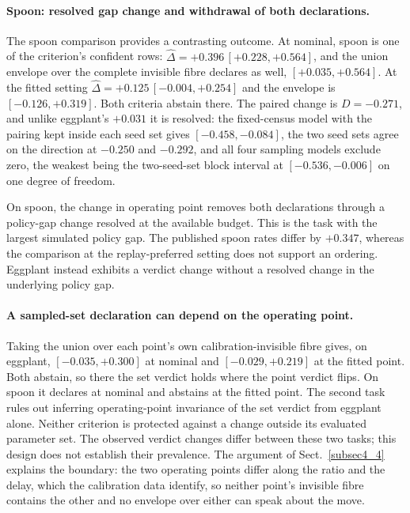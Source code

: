 \documentclass[pdflatex,iicol,sn-apa]{sn-jnl}
\theoremstyle{remark}
\begin{document}
\paragraph{Spoon: resolved gap change and withdrawal of both declarations.}
The spoon comparison provides a contrasting outcome. At nominal, spoon is one of the criterion's confident rows:
$\hat\Delta = +0.396\,[+0.228, +0.564]$, and the union envelope over the complete invisible fibre
declares as well, $[+0.035, +0.564]$. At the fitted setting $\hat\Delta = +0.125\,[-0.004, +0.254]$
and the envelope is $[-0.126, +0.319]$. Both criteria abstain there. The paired change is
$D = -0.271$, and unlike eggplant's $+0.031$ it is resolved: the fixed-census model with the
pairing kept inside each seed set gives $[-0.458, -0.084]$, the two seed sets agree on the direction
at $-0.250$ and $-0.292$, and all four sampling models exclude zero, the weakest being the
two-seed-set block interval at $[-0.536, -0.006]$ on one degree of freedom.

On spoon, the change in operating point removes both declarations through a policy-gap change
resolved at the available budget. This is the task with the largest simulated policy gap.
The published spoon rates differ by $+0.347$, whereas the comparison at the replay-preferred
setting does not support an ordering. Eggplant instead exhibits a verdict change without a
resolved change in the underlying policy gap.

\paragraph{A sampled-set declaration can depend on the operating point.}
Taking the union over each point's own calibration-invisible fibre gives, on eggplant,
$[-0.035, +0.300]$ at nominal and $[-0.029, +0.219]$ at the fitted point. Both abstain, so
there the set verdict holds where the point verdict flips. On spoon it declares at nominal and
abstains at the fitted point. The second task rules out inferring operating-point invariance of
the set verdict from eggplant alone. Neither criterion is protected against a change outside its
evaluated parameter set. The observed verdict changes differ between these two tasks; this design
does not establish their prevalence. The argument of Sect.~\ref{subsec4_4} explains the boundary: the two
operating points differ along the ratio and the delay, which the calibration data identify,
so neither point's invisible fibre contains the other and no envelope over either can speak about
the move.
\end{document}
